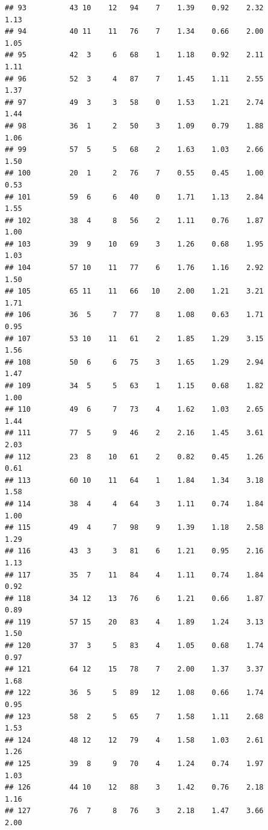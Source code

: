 \documentclass[
]{book}
\theoremstyle{definition}
\theoremstyle{definition}
\theoremstyle{definition}
\theoremstyle{definition}
\theoremstyle{remark}
\begin{document}
\begin{verbatim}
## 93          43 10    12   94    7    1.39    0.92    2.32           1.13
## 94          40 11    11   76    7    1.34    0.66    2.00           1.05
## 95          42  3     6   68    1    1.18    0.92    2.11           1.11
## 96          52  3     4   87    7    1.45    1.11    2.55           1.37
## 97          49  3     3   58    0    1.53    1.21    2.74           1.44
## 98          36  1     2   50    3    1.09    0.79    1.88           1.06
## 99          57  5     5   68    2    1.63    1.03    2.66           1.50
## 100         20  1     2   76    7    0.55    0.45    1.00           0.53
## 101         59  6     6   40    0    1.71    1.13    2.84           1.55
## 102         38  4     8   56    2    1.11    0.76    1.87           1.00
## 103         39  9    10   69    3    1.26    0.68    1.95           1.03
## 104         57 10    11   77    6    1.76    1.16    2.92           1.50
## 105         65 11    11   66   10    2.00    1.21    3.21           1.71
## 106         36  5     7   77    8    1.08    0.63    1.71           0.95
## 107         53 10    11   61    2    1.85    1.29    3.15           1.56
## 108         50  6     6   75    3    1.65    1.29    2.94           1.47
## 109         34  5     5   63    1    1.15    0.68    1.82           1.00
## 110         49  6     7   73    4    1.62    1.03    2.65           1.44
## 111         77  5     9   46    2    2.16    1.45    3.61           2.03
## 112         23  8    10   61    2    0.82    0.45    1.26           0.61
## 113         60 10    11   64    1    1.84    1.34    3.18           1.58
## 114         38  4     4   64    3    1.11    0.74    1.84           1.00
## 115         49  4     7   98    9    1.39    1.18    2.58           1.29
## 116         43  3     3   81    6    1.21    0.95    2.16           1.13
## 117         35  7    11   84    4    1.11    0.74    1.84           0.92
## 118         34 12    13   76    6    1.21    0.66    1.87           0.89
## 119         57 15    20   83    4    1.89    1.24    3.13           1.50
## 120         37  3     5   83    4    1.05    0.68    1.74           0.97
## 121         64 12    15   78    7    2.00    1.37    3.37           1.68
## 122         36  5     5   89   12    1.08    0.66    1.74           0.95
## 123         58  2     5   65    7    1.58    1.11    2.68           1.53
## 124         48 12    12   79    4    1.58    1.03    2.61           1.26
## 125         39  8     9   70    4    1.24    0.74    1.97           1.03
## 126         44 10    12   88    3    1.42    0.76    2.18           1.16
## 127         76  7     8   76    3    2.18    1.47    3.66           2.00

\end{verbatim}
\end{document}
